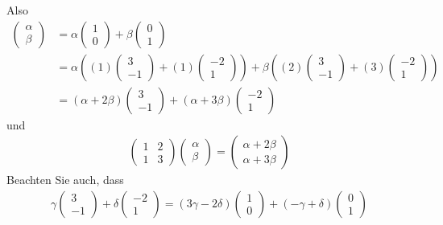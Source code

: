 \documentclass[11pt]{report}
\begin{document}
Also
\begin{align}
\begin{pmatrix} \alpha \\ \beta\end{pmatrix} &= \alpha \begin{pmatrix} 1 \\ 0 \end{pmatrix} + \beta \begin{pmatrix} 0 \\ 1 \end{pmatrix} \\
&= \alpha((1) \begin{pmatrix} 3 \\ -1 \end{pmatrix} + (1) \begin{pmatrix} -2 \\ 1 \end{pmatrix}) + \beta((2) \begin{pmatrix} 3 \\ -1 \end{pmatrix} + (3) \begin{pmatrix} -2 \\ 1 \end{pmatrix}) \\
&= (\alpha + 2 \beta) \begin{pmatrix} 3 \\ -1 \end{pmatrix} + (\alpha + 3 \beta) \begin{pmatrix} -2 \\ 1 \end{pmatrix}
\end{align}
und 
\begin{align}
\begin{pmatrix} 1 & 2\\ 1 & 3 \end{pmatrix} \begin{pmatrix} \alpha \\ \beta \end{pmatrix} = \begin{pmatrix} \alpha + 2 \beta \\ \alpha + 3 \beta \end{pmatrix}
\end{align}
Beachten Sie auch, dass
\begin{align}
\gamma \begin{pmatrix} 3 \\ -1 \end{pmatrix} + \delta \begin{pmatrix} -2 \\ 1 \end{pmatrix} = (3\gamma - 2 \delta) \begin{pmatrix} 1 \\ 0 \end{pmatrix} + (-\gamma + \delta) \begin{pmatrix} 0 \\ 1 \end{pmatrix}
\end{align}
\end{document}
